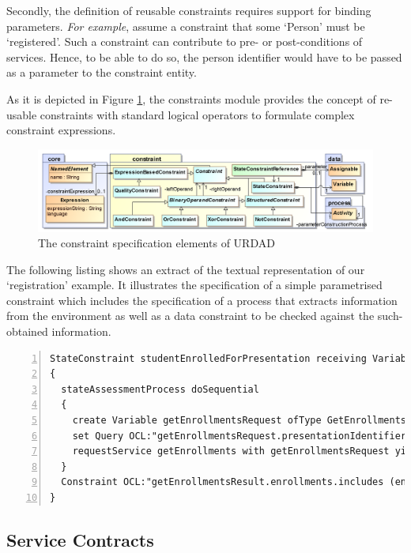 {Secondly, the definition of reusable constraints requires support for binding parameters. \emph{For example}, assume a constraint that some `Person' must be `registered'. Such a constraint can contribute to pre- or post-conditions of services. Hence, to be able to do so, the person identifier would have to be passed as a parameter to the constraint entity.

As it is depicted in Figure \ref{fig:constraintModule}, the constraints module provides the concept of re-usable constraints with standard logical operators to formulate complex constraint expressions.
\begin{figure}[Htbp]
  \centering
  \includegraphics{constraint}
  \caption{The constraint specification elements of URDAD}
  \label{fig:constraintModule}
\end{figure}

The following listing shows an extract of the textual representation of our `registration' example. It illustrates the specification of a simple parametrised constraint which includes the specification of a process that extracts information from the environment as well as a data constraint to be checked against the such-obtained information.
\lstset{language=urdad,caption=Specifying a state constraint in the textual URDAD DSL syntax.,label=constraintTextSyntax}
\small \begin{lstlisting}[numbers=left,escapechar=|]
StateConstraint studentEnrolledForPresentation receiving Variable enrollForPresentationRequest ofType EnrollForPresentationRequest
{
  stateAssessmentProcess doSequential
  {
    create Variable getEnrollmentsRequest ofType GetEnrollmentsRequest
    set Query OCL:"getEnrollmentsRequest.presentationIdentifier" equalTo Query OCL:"enrollForPresentationRequest.presentationIdentifier"
    requestService getEnrollments with getEnrollmentsRequest yielding Variable getEnrollmentsResult ofType GetEnrollmentsResult
  }
  Constraint OCL:"getEnrollmentsResult.enrollments.includes (enrollForPresentationRequest.personIdentifier)"
}
\end{lstlisting}\normalsize


\subsection{Service Contracts}

}
